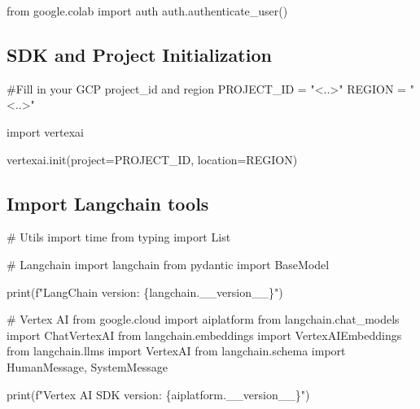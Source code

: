 \documentclass[
  letterpaper,
  DIV=11,
  numbers=noendperiod]{scrreprt}
\newenvironment{Shaded}{\begin{snugshade}}{\end{snugshade}}
\newcommand{\BuiltInTok}[1]{\textcolor[rgb]{0.00,0.23,0.31}{#1}}
\newcommand{\CommentTok}[1]{\textcolor[rgb]{0.37,0.37,0.37}{#1}}
\newcommand{\ImportTok}[1]{\textcolor[rgb]{0.00,0.46,0.62}{#1}}
\newcommand{\NormalTok}[1]{\textcolor[rgb]{0.00,0.23,0.31}{#1}}
\newcommand{\OperatorTok}[1]{\textcolor[rgb]{0.37,0.37,0.37}{#1}}
\newcommand{\SpecialCharTok}[1]{\textcolor[rgb]{0.37,0.37,0.37}{#1}}
\newcommand{\SpecialStringTok}[1]{\textcolor[rgb]{0.13,0.47,0.30}{#1}}
\newcommand{\StringTok}[1]{\textcolor[rgb]{0.13,0.47,0.30}{#1}}
\begin{document}
\begin{Shaded}
\begin{Highlighting}[]
\ImportTok{from}\NormalTok{ google.colab }\ImportTok{import}\NormalTok{ auth}
\NormalTok{auth.authenticate\_user()}
\end{Highlighting}
\end{Shaded}

\hypertarget{sdk-and-project-initialization}{%
\subsection{SDK and Project
Initialization}\label{sdk-and-project-initialization}}

\begin{Shaded}
\begin{Highlighting}[]
\CommentTok{\#Fill in your GCP project\_id and region}
\NormalTok{PROJECT\_ID }\OperatorTok{=} \StringTok{"\textless{}..\textgreater{}"}
\NormalTok{REGION }\OperatorTok{=} \StringTok{"\textless{}..\textgreater{}"}

\ImportTok{import}\NormalTok{ vertexai}

\NormalTok{vertexai.init(project}\OperatorTok{=}\NormalTok{PROJECT\_ID, location}\OperatorTok{=}\NormalTok{REGION)}
\end{Highlighting}
\end{Shaded}

\hypertarget{import-langchain-tools}{%
\subsection{Import Langchain tools}\label{import-langchain-tools}}

\begin{Shaded}
\begin{Highlighting}[]
\CommentTok{\# Utils}
\ImportTok{import}\NormalTok{ time}
\ImportTok{from}\NormalTok{ typing }\ImportTok{import}\NormalTok{ List}

\CommentTok{\# Langchain}
\ImportTok{import}\NormalTok{ langchain}
\ImportTok{from}\NormalTok{ pydantic }\ImportTok{import}\NormalTok{ BaseModel}

\BuiltInTok{print}\NormalTok{(}\SpecialStringTok{f"LangChain version: }\SpecialCharTok{\{}\NormalTok{langchain}\SpecialCharTok{.}\NormalTok{\_\_version\_\_}\SpecialCharTok{\}}\SpecialStringTok{"}\NormalTok{)}

\CommentTok{\# Vertex AI}
\ImportTok{from}\NormalTok{ google.cloud }\ImportTok{import}\NormalTok{ aiplatform}
\ImportTok{from}\NormalTok{ langchain.chat\_models }\ImportTok{import}\NormalTok{ ChatVertexAI}
\ImportTok{from}\NormalTok{ langchain.embeddings }\ImportTok{import}\NormalTok{ VertexAIEmbeddings}
\ImportTok{from}\NormalTok{ langchain.llms }\ImportTok{import}\NormalTok{ VertexAI}
\ImportTok{from}\NormalTok{ langchain.schema }\ImportTok{import}\NormalTok{ HumanMessage, SystemMessage}

\BuiltInTok{print}\NormalTok{(}\SpecialStringTok{f"Vertex AI SDK version: }\SpecialCharTok{\{}\NormalTok{aiplatform}\SpecialCharTok{.}\NormalTok{\_\_version\_\_}\SpecialCharTok{\}}\SpecialStringTok{"}\NormalTok{)}
\end{Highlighting}
\end{Shaded}
\end{document}
